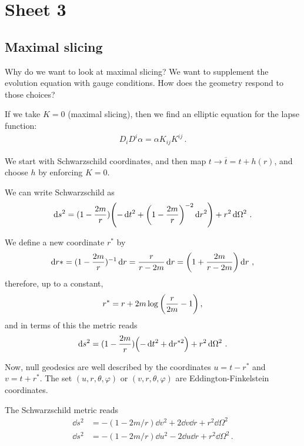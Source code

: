 \documentclass[main.tex]{subfiles}
\begin{document}
\section*{Sheet 3}

\subsection{Maximal slicing}


Why do we want to look at maximal slicing? 
We want to supplement the evolution equation with gauge conditions. 
How does the geometry respond to those choices? 

If we take \(K = 0\) (maximal slicing), then we find an elliptic equation for the lapse function: 
%
\begin{align}
D_i D^i \alpha = \alpha K_{ij} K^{ij}
\,.
\end{align}

We start with Schwarzschild coordinates, and then map \(t \to \overline{t} = t + h(r)\), and choose \(h\) by enforcing \(K =0 \). 

We can write Schwarzschild as 
%
\begin{align}
\dd{s^2} = (1 - \frac{2m}{r}) \qty(- \dd{t^2} + \qty(1 - \frac{2m}{r})^{-2} \dd{r^2}) + r^2 \dd{\Omega^2}
\,.
\end{align}

We define a new coordinate \(r^{*}\) by 
%
\begin{align}
\dd{r*} = ( 1- \frac{2m}{r})^{-1} \dd{r} = \frac{r}{r - 2m} \dd{r}
= \qty(1 + \frac{2m}{r - 2m}) \dd{r}
\,,
\end{align}
%
therefore, up to a constant, 
%
\begin{align}
r^{*} = r + 2m \log \qty( \frac{r}{2m} - 1) 
\,,
\end{align}
%
and in terms of this the metric reads 
%
\begin{align}
\dd{s^2} = (1 - \frac{2m}{r}) \qty(- \dd{t^2} + \dd{r^{*2}}) + r^2 \dd{\Omega^2}
\,.
\end{align}

Now, null geodesics are well described by the coordinates \(u = t - r^{*}\) and \(v = t + r^{*}\). The set \((u, r, \theta , \varphi )\) or \((v, r, \theta , \varphi )\) are Eddington-Finkelstein coordinates. 

The Schwarzschild metric reads 
%
\begin{align}
\dd{s^2} &= - (1 - 2m/r) \dd{v^2} + 2 \dd{v} \dd{r} + r^2 \dd{\Omega^2} \\
\dd{s^2} &= - (1 - 2m/r) \dd{u^2} - 2 \dd{u} \dd{r} + r^2 \dd{\Omega^2}
\,.
\end{align}
\end{document}
